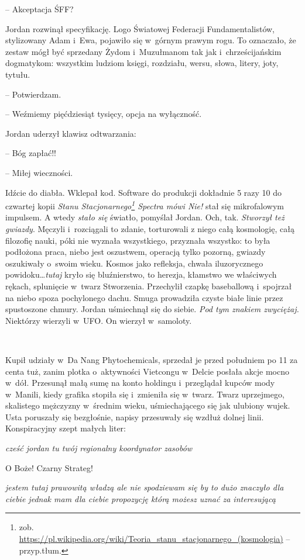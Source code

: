 \documentclass[oneside,polish,11pt,sfheadings]{mwbk}
\begin{document}
-- Akceptacja ŚFF?

Jordan rozwinął specyfikację. Logo Światowej Federacji Fundamentalistów,
stylizowany Adam i~Ewa, pojawiło się w~górnym prawym rogu. To oznaczało,
że zestaw mógł być sprzedany Żydom i~Muzułmanom tak jak i~chrześcijańskim dogmatykom: wszystkim ludziom księgi, rozdziału, wersu,
słowa, litery, joty, tytułu.

-- Potwierdzam.

-- Weźmiemy pięćdziesiąt tysięcy, opcja na wyłączność.

Jordan uderzył klawisz odtwarzania: 

-- Bóg zapłać!!

-- Miłej wieczności.

Idźcie do diabła. Wklepał kod. Software do produkcji dokładnie 5 razy 10
do czwartej kopii \emph{Stanu Stacjonarnego\footnote{zob.
\url{https://pl.wikipedia.org/wiki/Teoria\_stanu\_stacjonarnego\_(kosmologia)}
-- przyp.tłum.} Spectra mówi Nie!} stał się mikrofalowym impulsem. A
wtedy \emph{stało się} światło, pomyślał Jordan. Och, tak.
\emph{Stworzył też gwiazdy}. Męczyli i~rozciągali to zdanie, torturowali
z niego całą kosmologię, całą filozofię nauki, póki nie wyznała
wszystkiego, przyznała wszystko: to była podłożona praca, niebo jest
oszustwem, operacją tylko pozorną, gwiazdy oszukiwały o~swoim wieku.
Kosmos jako refleksja, chwała iluzorycznego powidoku\ldots \emph{tutaj}
kryło się bluźnierstwo, to herezja, kłamstwo we właściwych rękach,
splunięcie w~twarz Stworzenia. Przechylił czapkę baseballową i~spojrzał
na niebo spoza pochylonego dachu. Smuga prowadziła czyste białe linie
przez spustoszone chmury. Jordan uśmiechnął się do siebie. \emph{Pod tym
znakiem zwyciężaj.} Niektórzy wierzyli w~UFO. On wierzył w~samoloty.

~

Kupił udziały w~Da Nang Phytochemicals, sprzedał je przed południem po
11 za centa tuż, zanim plotka o~aktywności Vietcongu w~Delcie posłała
akcje mocno w~dół. Przesunął małą sumę na konto holdingu i~przeglądał
kupców mody w~Manili, kiedy grafika stopiła się i~zmieniła się w~twarz.
Twarz uprzejmego, skalistego mężczyzny w~średnim wieku, uśmiechającego
się jak ulubiony wujek. Usta poruszały się bezgłośnie, napisy przesuwały
się wzdłuż dolnej linii. Konspiracyjny szept małych liter:

\emph{cześć jordan tu twój regionalny koordynator zasobów}

O Boże! Czarny Strateg!

\emph{jestem tutaj prawowitą władzą ale nie spodziewam się by to dużo
znaczyło dla ciebie jednak mam dla ciebie propozycję którą możesz uznać
za interesującą}
\end{document}
